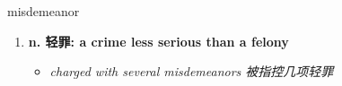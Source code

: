 
\begin{frame}
{\huge misdemeanor}
\begin{center}
\begin{enumerate}\Large
  \item \textbf{n. 轻罪: a crime less serious than a felony}
  \begin{itemize}
    \item \em{\Large{charged with several misdemeanors 被指控几项轻罪}}
  \end{itemize}
\end{enumerate}
\end{center}
\end{frame}

